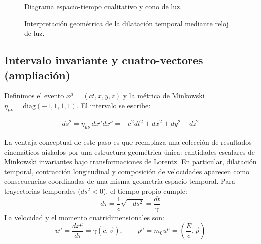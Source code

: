 \documentclass[12pt, a4paper]{article}
\theoremstyle{plain}
\theoremstyle{definition}
\theoremstyle{remark}
\newcommand{\ve}[1]{\vec{#1}}
\begin{document}
\begin{figure}[H]
  \centering
  \caption{Diagrama espacio-tiempo cualitativo y cono de luz.}
\end{figure}

\begin{figure}[H]
  \centering
  \caption{Interpretación geométrica de la dilatación temporal mediante reloj de luz.}
\end{figure}

\subsection{Intervalo invariante y cuatro-vectores (ampliación)}

Definimos el evento $x^\mu=(ct,x,y,z)$ y la métrica de Minkowski
$\eta_{\mu\nu}=\mathrm{diag}(-1,1,1,1)$. El intervalo se escribe:
\begin{mdframed}[style=resultado]
\begin{equation}
  ds^2=\eta_{\mu\nu}\,dx^\mu dx^\nu
  =-c^2dt^2+dx^2+dy^2+dz^2
\end{equation}
\end{mdframed}
La ventaja conceptual de este paso es que reemplaza una colección de resultados cinemáticos
aislados por una estructura geométrica única: cantidades escalares de Minkowski invariantes
bajo transformaciones de Lorentz.
En particular, dilatación temporal, contracción longitudinal y composición de velocidades
aparecen como consecuencias coordinadas de una misma geometría espacio-temporal.
Para trayectorias temporales ($ds^2<0$), el tiempo propio cumple:
\begin{equation}
  d\tau=\frac{1}{c}\sqrt{-ds^2}=\frac{dt}{\gamma}
\end{equation}
La velocidad y el momento cuatridimensionales son:
\begin{equation}
  u^\mu=\frac{dx^\mu}{d\tau}=\gamma(c,\ve{v}),\qquad
  p^\mu=m_0u^\mu=\left(\frac{E}{c},\ve{p}\right)
\end{equation}
\end{document}
